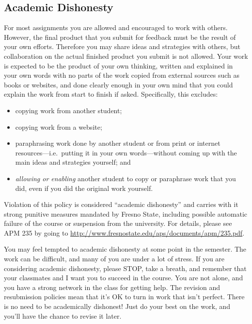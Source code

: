 \hypertarget{sec:academic-dishonesty}{%
\subsection{Academic Dishonesty}\label{sec:academic-dishonesty}}

For most assignments you are allowed and encouraged to work with others.
However, the final product that you submit for feedback must be the
result of your own efforts. Therefore you may share ideas and strategies
with others, but collaboration on the actual finished product you submit
is not allowed. Your work is expected to be the product of your own
thinking, written and explained in your own words with no parts of the
work copied from external sources such as books or websites, and done
clearly enough in your own mind that you could explain the work from
start to finish if asked. Specifically, this excludes:

\begin{itemize}
\tightlist
\item
  copying work from another student;
\item
  copying work from a website;
\item
  paraphrasing work done by another student or from print or internet
  resources---i.e.~putting it in your own words---without coming up with
  the main ideas and strategies yourself; and
\item
  \emph{allowing or enabling} another student to copy or paraphrase work
  that you did, even if you did the original work yourself.
\end{itemize}

Violation of this policy is considered ``academic dishonesty'' and
carries with it strong punitive measures mandated by Fresno State,
including possible automatic failure of the course or suspension from
the university. For details, please see APM 235 by going to
\url{http://www.fresnostate.edu/aps/documents/apm/235.pdf}.

You may feel tempted to academic dishonesty at some point in the
semester. The work can be difficult, and many of you are under a lot of
stress. If you are considering academic dishonesty, please STOP, take a
breath, and remember that your classmates and I want you to succeed in
the course. You are not alone, and you have a strong network in the
class for getting help. The revision and resubmission policies mean that
it's OK to turn in work that isn't perfect. There is no need to be
academically dishonest! Just do your best on the work, and you'll have
the chance to revise it later.

